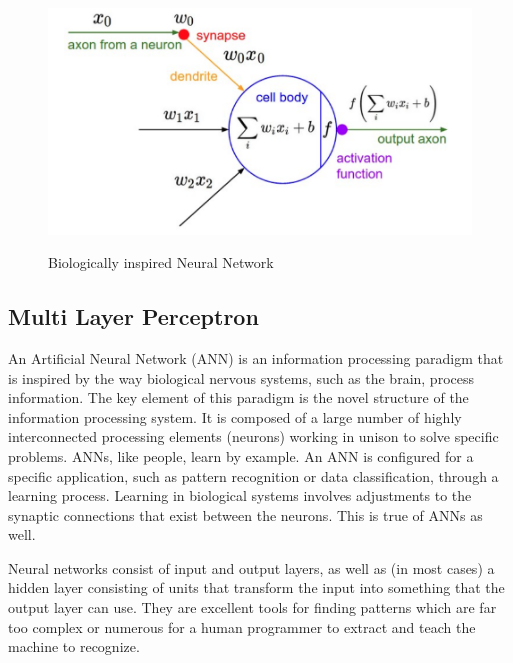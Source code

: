 \begin{figure}[H]
\begin{center}
\includegraphics[height=.28\textheight]{Chapter2/Figs/NeuralNetwork.png}
\label{fig:Neural_Network}
\caption{Biologically inspired Neural Network \cite{karparthy}}
\end{center}
\end{figure}

\subsection{Multi Layer Perceptron}

An Artificial Neural Network (ANN) is an information processing paradigm that is inspired by the way biological nervous systems, such as the brain, process information. The key element of this paradigm is the novel structure of the information processing system. It is composed of a large number of highly interconnected processing elements (neurons) working in unison to solve specific problems. ANNs, like people, learn by example. An ANN is configured for a specific application, such as pattern recognition or data classification, through a learning process. Learning in biological systems involves adjustments to the synaptic connections that exist between the neurons. This is true of ANNs as well.


Neural networks consist of input and output layers, as well as (in most cases) a hidden layer consisting of units that transform the input into something that the output layer can use. They are excellent tools for finding patterns which are far too complex or numerous for a human programmer to extract and teach the machine to recognize.


